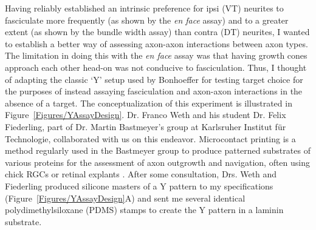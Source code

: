 Having reliably established an intrinsic preference for ipsi (VT) neurites to fasciculate more frequently (as shown by the \emph{en face} assay) and to a greater extent (as shown by the bundle width assay) than contra (DT) neurites, I wanted to establish a better way of assessing axon-axon interactions between axon types.
The limitation in doing this with the \emph{en face} assay was that having growth cones approach each other head-on was not conducive to fasciculation.
Thus, I thought of adapting the classic `Y' setup used by Bonhoeffer for testing target choice \cite{bonhoeffer1985position} for the purposes of instead assaying fasciculation and axon-axon interactions in the absence of a target.
The conceptualization of this experiment is illustrated in Figure~\ref{Figures/YAssayDesign}.
Dr. Franco Weth and his student Dr. Felix Fiederling, part of Dr. Martin Bastmeyer's group at Karlsruher Institut f\"ur Technologie, collaborated with us on this endeavor.
Microcontact printing is a method regularly used in the Bastmeyer group to produce patterned substrates of various proteins for the assessment of axon outgrowth and navigation, often using chick RGCs or retinal explants \cite{von2006microcontact}.
After some consultation, Drs. Weth and Fiederling produced silicone masters of a Y pattern to my specifications (Figure~\ref{Figures/YAssayDesign}A) and sent me several identical polydimethylsiloxane (PDMS) stamps to create the Y pattern in a laminin substrate.

